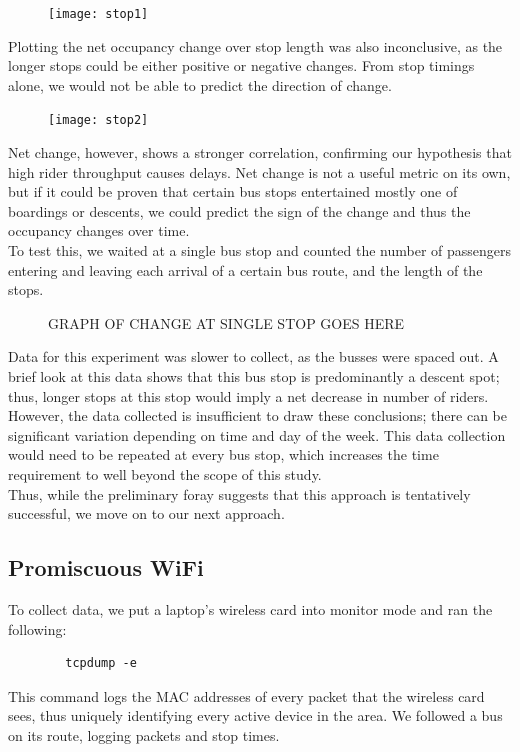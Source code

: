\documentclass[letterpaper]{scrartcl}
\begin{document}
	\begin{figure}[H]
	\texttt{[image: stop1]}
	\centering
	\end{figure}

	Plotting the net occupancy change over stop length was also inconclusive, as the longer stops could be either positive or negative changes.
	From stop timings alone, we would not be able to predict the direction of change.

	\begin{figure}[H]
	\texttt{[image: stop2]}
	\centering
	\end{figure}

	Net change, however, shows a stronger correlation, confirming our hypothesis that high rider throughput causes delays.
	Net change is not a useful metric on its own, but if it could be proven that certain bus stops entertained mostly one of boardings or descents, we could predict the sign of the change and thus the occupancy changes over time.
	\\
	To test this, we waited at a single bus stop and counted the number of passengers entering and leaving each arrival of a certain bus route, and the length of the stops.

	\begin{figure}[H]
	GRAPH OF CHANGE AT SINGLE STOP GOES HERE
	\centering
	\end{figure}

	Data for this experiment was slower to collect, as the busses were spaced out. A brief look at this data shows that this bus stop is predominantly a descent spot; thus, longer stops at this stop would imply a net decrease in number of riders.
	\\
	However, the data collected is insufficient to draw these conclusions; there can be significant variation depending on time and day of the week.
	This data collection would need to be repeated at every bus stop, which increases the time requirement to well beyond the scope of this study.
	\\
	Thus, while the preliminary foray suggests that this approach is tentatively successful, we move on to our next approach.
	
\subsection*{Promiscuous WiFi}
	To collect data, we put a laptop's wireless card into monitor mode and ran the following:
	\begin{verbatim}
		tcpdump -e
	\end{verbatim}
	This command logs the MAC addresses of every packet that the wireless card sees, thus uniquely identifying every active device in the area.
	We followed a bus on its route, logging packets and stop times.
\end{document}
